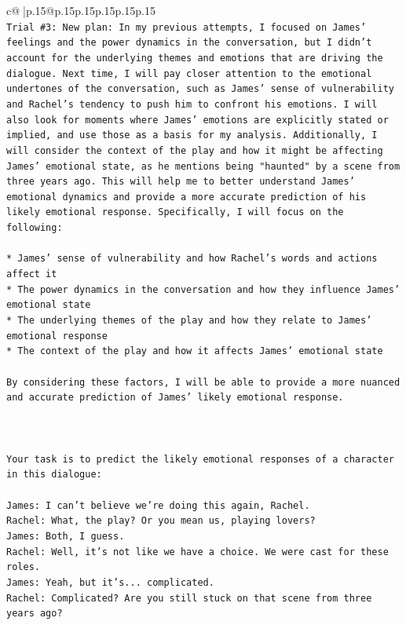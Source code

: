 \documentclass{article}
\begin{document}
{\begin{supertabular}{c@{$\;$}|p{.15\linewidth}@{}p{.15\linewidth}p{.15\linewidth}p{.15\linewidth}p{.15\linewidth}p{.15\linewidth}}
{{{\\ 
\texttt{Trial \#3: New plan: In my previous attempts, I focused on James' feelings and the power dynamics in the conversation, but I didn't account for the underlying themes and emotions that are driving the dialogue. Next time, I will pay closer attention to the emotional undertones of the conversation, such as James' sense of vulnerability and Rachel's tendency to push him to confront his emotions. I will also look for moments where James' emotions are explicitly stated or implied, and use those as a basis for my analysis. Additionally, I will consider the context of the play and how it might be affecting James' emotional state, as he mentions being "haunted" by a scene from three years ago. This will help me to better understand James' emotional dynamics and provide a more accurate prediction of his likely emotional response. Specifically, I will focus on the following:} \\
\\ 
\texttt{* James' sense of vulnerability and how Rachel's words and actions affect it} \\
\texttt{* The power dynamics in the conversation and how they influence James' emotional state} \\
\texttt{* The underlying themes of the play and how they relate to James' emotional response} \\
\texttt{* The context of the play and how it affects James' emotional state} \\
\\ 
\texttt{By considering these factors, I will be able to provide a more nuanced and accurate prediction of James' likely emotional response.} \\
\\ 
\\ 
\\ 
\texttt{Your task is to predict the likely emotional responses of a character in this dialogue:} \\
\\ 
\texttt{James: I can't believe we're doing this again, Rachel. } \\
\texttt{Rachel: What, the play? Or you mean us, playing lovers?} \\
\texttt{James: Both, I guess. } \\
\texttt{Rachel: Well, it's not like we have a choice. We were cast for these roles. } \\
\texttt{James: Yeah, but it's... complicated.} \\
\texttt{Rachel: Complicated? Are you still stuck on that scene from three years ago?} \\
}}}
\end{supertabular}}
\end{document}
